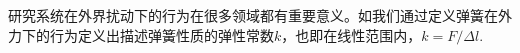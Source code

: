 
\begin{issues}
\issueTODO
\end{issues}

研究系统在外界扰动下的行为在很多领域都有重要意义。如我们通过定义弹簧在外力下的行为定义出描述弹簧性质的弹性常数$k$，也即在线性范围内，$k=F/\Delta l$.
